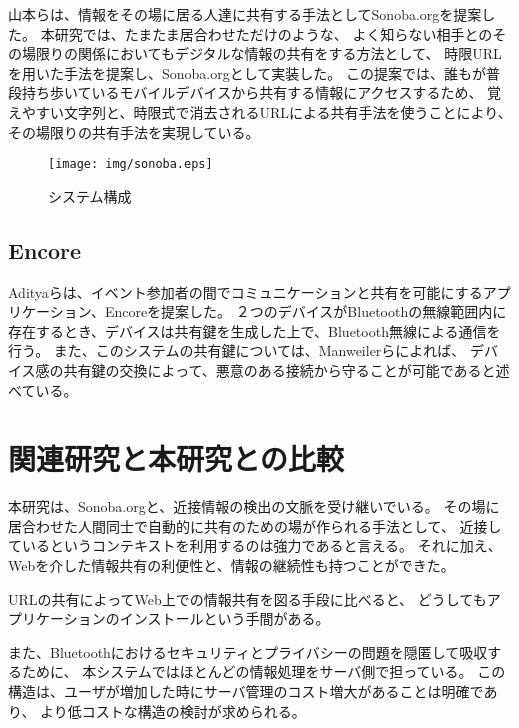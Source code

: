 山本らは、情報をその場に居る人達に共有する手法としてSonoba.org\cite{山本伶:2013-03-06}を提案した。
本研究では、たまたま居合わせただけのような、
よく知らない相手とのその場限りの関係においてもデジタルな情報の共有をする方法として、
時限URLを用いた手法を提案し、Sonoba.orgとして実装した。
この提案では、誰もが普段持ち歩いているモバイルデバイスから共有する情報にアクセスするため、
覚えやすい文字列と、時限式で消去されるURLによる共有手法を使うことにより、その場限りの共有手法を実現している。

\begin{figure}[h]
  \begin{center}
    \texttt{[image: img/sonoba.eps]}
  \end{center}
  \caption{システム構成}
  \label{fig:sonoba}
\end{figure}

\subsection{Encore}

Adityaらは、イベント参加者の間でコミュニケーションと共有を可能にするアプリケーション、Encoreを提案した。\cite{Aditya:2014:EPC:2594368.2594374}
２つのデバイスがBluetoothの無線範囲内に存在するとき、デバイスは共有鍵を生成した上で、Bluetooth無線による通信を行う。
また、このシステムの共有鍵については、Manweilerら\cite{Manweiler:2009:SET:1653662.1653692}によれば、
デバイス感の共有鍵の交換によって、悪意のある接続から守ることが可能であると述べている。



\section{関連研究と本研究との比較}

本研究は、Sonoba.org\cite{山本伶:2013-03-06}と、近接情報の検出の文脈を受け継いでいる。
その場に居合わせた人間同士で自動的に共有のための場が作られる手法として、
近接しているというコンテキストを利用するのは強力であると言える。
それに加え、Webを介した情報共有の利便性と、情報の継続性も持つことができた。

URLの共有によってWeb上での情報共有を図る手段に比べると、
どうしてもアプリケーションのインストールという手間がある。

また、Bluetoothにおけるセキュリティとプライバシーの問題を隠匿して吸収するために、
本システムではほとんどの情報処理をサーバ側で担っている。
この構造は、ユーザが増加した時にサーバ管理のコスト増大があることは明確であり、
より低コストな構造の検討が求められる。
